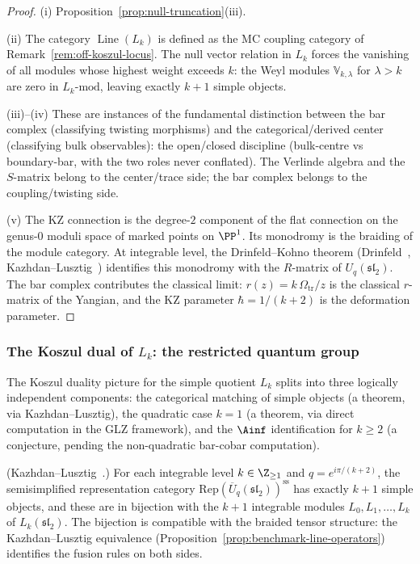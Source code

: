\begin{proof}
(i) Proposition~\ref{prop:null-truncation}(iii).

(ii) The category $\operatorname{Line}(L_k)$ is defined as the
MC coupling category of
Remark~\ref{rem:off-koszul-locus}. The null vector relation
in $L_k$ forces the vanishing of all modules whose
highest weight exceeds $k$: the Weyl modules
$\mathbb{V}_{k,\lambda}$ for $\lambda > k$ are zero in
$L_k\text{-mod}$, leaving exactly $k + 1$ simple objects.

(iii)--(iv) These are instances of the fundamental distinction
between the bar complex (classifying twisting morphisms) and
the categorical/derived center (classifying bulk observables):
the open/closed discipline (bulk-centre vs boundary-bar, with the two
roles never conflated). The Verlinde algebra and the
$S$-matrix belong to the center/trace side; the bar complex
belongs to the coupling/twisting side.

(v) The KZ connection is the degree-$2$ component of the flat
connection on the genus-$0$ moduli space of marked points on
$\PP^1$. Its monodromy is the braiding of the module category.
At integrable level, the Drinfeld--Kohno theorem
(Drinfeld~\cite{Dri89}, Kazhdan--Lusztig~\cite{KL93})
identifies this monodromy with the $R$-matrix of
$U_q(\mathfrak{sl}_2)$. The bar complex contributes the
classical limit: $r(z) = k\,\Omega_{\mathrm{tr}}/z$ is the classical
$r$-matrix of the Yangian, and the KZ parameter
$\hbar = 1/(k+2)$ is the deformation parameter.
\end{proof}


\subsubsection{The Koszul dual of $L_k$:
 the restricted quantum group}
\label{subsubsec:conjectural-Lk-koszul-dual}

The Koszul duality picture for the simple quotient $L_k$
splits into three logically independent components: the
categorical matching of simple objects (a theorem, via
Kazhdan--Lusztig), the quadratic case $k = 1$ (a theorem,
via direct computation in the GLZ framework), and the
$\Ainf$ identification for $k \ge 2$ (a conjecture, pending
the non-quadratic bar-cobar computation).

\begin{proposition}
\label{prop:Lk-rep-matching}
\textup{(Kazhdan--Lusztig~\cite{KL93}.)}
For each integrable level $k \in \Z_{\ge 1}$ and
$q = e^{i\pi/(k+2)}$, the semisimplified representation
category
$\mathrm{Rep}(\overline{U}_q(\mathfrak{sl}_2))^{\mathrm{ss}}$
has exactly $k + 1$ simple objects, and these are in
bijection with the $k + 1$ integrable modules
$L_0, L_1, \ldots, L_k$ of $L_k(\mathfrak{sl}_2)$. The
bijection is compatible with the braided tensor structure:
the Kazhdan--Lusztig equivalence
\textup{(}Proposition~\textup{\ref{prop:benchmark-line-operators}}\textup{)}
identifies the fusion rules on both sides.
\end{proposition}

